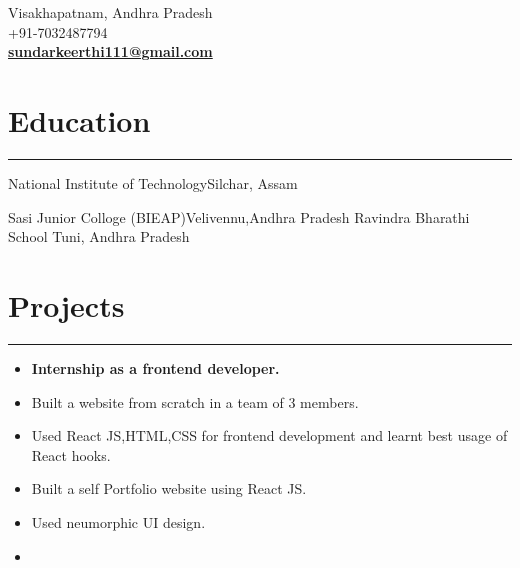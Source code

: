 \documentclass[]{sundar}
\begin{document}
\begin{minipage}[t]{0.66\textwidth} 
\hspace*{0pt}\hfill    \\
\hspace*{0pt}\hfill    \\
\hspace*{0pt}\hfill \faMapMarker \enspace Visakhapatnam, Andhra Pradesh \\
\hspace*{0pt}\hfill \faMobile \enspace +91-7032487794 \\
\hspace*{0pt}\hfill \faEnvelopeO \enspace\textbf{\href{mailto: sundarkeerthi111@gmail.com}{sundarkeerthi111@gmail.com}} \\


\section{Education}
\noindent\rule{12.5cm}{0.4pt}
        {National Institute of Technology}{Silchar, Assam}

        {Sasi Junior Colloge (BIEAP)}{Velivennu,Andhra Pradesh}
        {Ravindra Bharathi School }{Tuni, Andhra Pradesh}


\section{Projects}
\noindent\rule{12.5cm}{0.4pt}


{
 {\begin{itemize}
   \item \textbf{Internship as a frontend developer.}
    \item Built a website from scratch in a team of 3 members.
    \item  Used React JS,HTML,CSS for frontend development and learnt best usage of React hooks.
  \end{itemize}
  }
}
{
{\begin{itemize}
  \item Built  a self Portfolio website using React JS. 
  \item Used neumorphic UI design.
  \item {}
\end{itemize}
}
}




\end{minipage}
\end{document}
